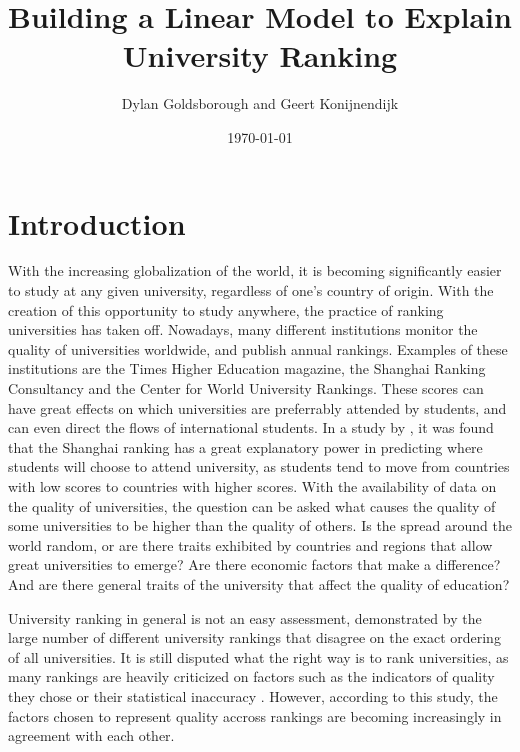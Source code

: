 \documentclass{stats_apa_style2}
\title{Building a Linear Model to Explain University Ranking}
\author{Dylan Goldsborough and Geert Konijnendijk}
\date{\today}
\begin{document}
\maketitle



\section*{Introduction}

With the increasing globalization of the world, it is becoming significantly
easier to study at any given university, regardless of one's country of origin.
With the creation of this opportunity to study anywhere, the practice of ranking
universities has taken off. Nowadays, many different institutions monitor the
quality of universities worldwide, and publish annual rankings. Examples of
these institutions are the Times Higher Education magazine, the Shanghai Ranking
Consultancy and the Center for World University Rankings. These scores can have
great effects on which universities are preferrably attended by students, and
can even direct the flows of international students. In a study by
, it was found that the Shanghai ranking has a great
explanatory power in predicting where students will choose to attend university,
as students tend to move from countries with low scores to countries with higher
scores. With the availability of data on the quality of universities, the
question can be asked what causes the quality of some universities to be higher
than the quality of others. Is the spread around the world random, or are there
traits exhibited by countries and regions that allow great universities to
emerge?
Are there economic factors that make a difference? And are there general traits of the
university that affect the quality of education? 

University ranking in general is not an easy assessment, demonstrated by the
large number of different university rankings that disagree on the exact
ordering of all universities. It is still disputed what the right way is to rank
universities, as many rankings are heavily criticized on factors such as the
indicators of quality they chose or their statistical inaccuracy
\cite{dill2005academic}. However, according to this study, the factors chosen to
represent quality accross rankings are becoming increasingly in agreement with
each other.
\end{document}
